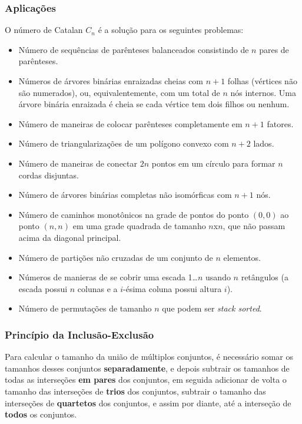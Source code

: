 \subsubsection*{Aplicações}
O número de Catalan $C_n$ é a solução para os seguintes problemas:
\begin{multicols}{2}
    \begin{itemize}
        \item Número de sequências de parênteses balanceados consistindo de $n$ pares de parênteses.
        \item Números de árvores binárias enraizadas cheias com $n+1$ folhas (vértices não são numerados), ou, equivalentemente, com um total de $n$ nós internos. Uma árvore binária enraizada é cheia se cada vértice tem dois filhos ou nenhum.
        \item Número de maneiras de colocar parênteses completamente em $n+1$ fatores.
        \item Número de triangularizações de um polígono convexo com $n+2$ lados.
        \item Número de maneiras de conectar $2n$ pontos em um círculo para formar $n$ cordas disjuntas.
        \item Número de árvores binárias completas não isomórficas com $n+1$ nós.
        \item Número de caminhos monotônicos na grade de pontos do ponto $(0,0)$ ao ponto $(n,n)$ em uma grade quadrada de tamanho $n$x$n$, que não passam acima da diagonal principal.
        \item Número de partições não cruzadas de um conjunto de $n$ elementos.
        \item Números de manieras de se cobrir uma escada 1\dots $n$ usando $n$ retângulos (a escada possui $n$ colunas e a $i$-ésima coluna possui altura $i$).
        \item Número de permutações de tamanho $n$ que podem ser \textit{stack sorted}.
    \end{itemize}
\end{multicols}

\subsubsection{Princípio da Inclusão-Exclusão}
Para calcular o tamanho da união de múltiplos conjuntos, é necessário somar os tamanhos desses conjuntos \textbf{separadamente}, e depois subtrair os tamanhos de todas as interseções \textbf{em pares} dos conjuntos, em seguida adicionar de volta o tamanho das interseções de \textbf{trios} dos conjuntos, subtrair o tamanho das interseções de \textbf{quartetos} dos conjuntos, e assim por diante, até a interseção de \textbf{todos} os conjuntos.

